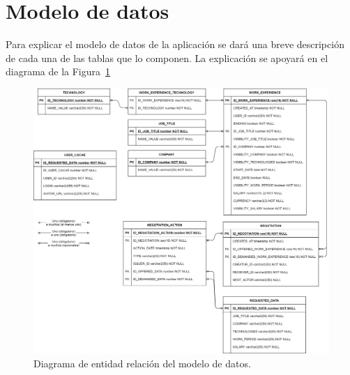 \documentclass[a4paper, 12pt]{book}
\begin{document}
    \section{Modelo de datos}
    \label{sec:data_model}
    Para explicar el modelo de datos de la aplicación se dará una breve descripción de cada una de las tablas que lo componen. La explicación se apoyará en el diagrama de la Figura~\ref{fig:data_model}

    \begin{figure}
        \centering
        \includegraphics[width=15cm, keepaspectratio]{img/Modelo_datos.png}
        \caption{Diagrama de entidad relación del modelo de datos.}\label{fig:data_model}
    \end{figure}
\end{document}
